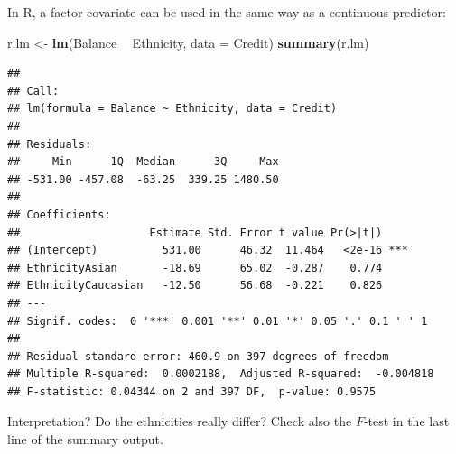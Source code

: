 \documentclass[10pt,ignorenonframetext,]{beamer}
\newenvironment{Shaded}{\begin{snugshade}}{\end{snugshade}}
\newcommand{\KeywordTok}[1]{\textcolor[rgb]{0.13,0.29,0.53}{\textbf{#1}}}
\newcommand{\DataTypeTok}[1]{\textcolor[rgb]{0.13,0.29,0.53}{#1}}
\newcommand{\StringTok}[1]{\textcolor[rgb]{0.31,0.60,0.02}{#1}}
\newcommand{\OperatorTok}[1]{\textcolor[rgb]{0.81,0.36,0.00}{\textbf{#1}}}
\newcommand{\NormalTok}[1]{#1}
\begin{document}
\begin{frame}[fragile]

In R, a factor covariate can be used in the same way as a continuous
predictor:

\scriptsize

\begin{Shaded}
\begin{Highlighting}[]
\NormalTok{r.lm <-}\StringTok{ }\KeywordTok{lm}\NormalTok{(Balance }\OperatorTok{~}\StringTok{ }\NormalTok{Ethnicity, }\DataTypeTok{data =}\NormalTok{ Credit)}
\KeywordTok{summary}\NormalTok{(r.lm)}
\end{Highlighting}
\end{Shaded}

\begin{verbatim}
## 
## Call:
## lm(formula = Balance ~ Ethnicity, data = Credit)
## 
## Residuals:
##     Min      1Q  Median      3Q     Max 
## -531.00 -457.08  -63.25  339.25 1480.50 
## 
## Coefficients:
##                    Estimate Std. Error t value Pr(>|t|)    
## (Intercept)          531.00      46.32  11.464   <2e-16 ***
## EthnicityAsian       -18.69      65.02  -0.287    0.774    
## EthnicityCaucasian   -12.50      56.68  -0.221    0.826    
## ---
## Signif. codes:  0 '***' 0.001 '**' 0.01 '*' 0.05 '.' 0.1 ' ' 1
## 
## Residual standard error: 460.9 on 397 degrees of freedom
## Multiple R-squared:  0.0002188,  Adjusted R-squared:  -0.004818 
## F-statistic: 0.04344 on 2 and 397 DF,  p-value: 0.9575
\end{verbatim}

\normalsize
Interpretation? Do the ethnicities really differ? Check also the
\(F\)-test in the last line of the summary output.

\end{frame}
\end{document}
